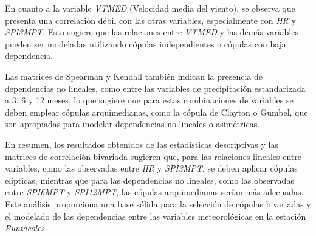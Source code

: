 En cuanto a la variable \textit{VTMED} (Velocidad media del viento), se observa que presenta una correlación débil con las otras variables, especialmente con \textit{HR} y \textit{SPI3MPT}. Esto sugiere que las relaciones entre \textit{VTMED} y las demás variables pueden ser modeladas utilizando cópulas independientes o cópulas con baja dependencia.

Las matrices de Spearman y Kendall también indican la presencia de dependencias no lineales, como entre las variables de precipitación estandarizada a 3, 6 y 12 meses, lo que sugiere que para estas combinaciones de variables se deben emplear cópulas arquimedianas, como la cópula de Clayton o Gumbel, que son apropiadas para modelar dependencias no lineales o asimétricas.

En resumen, los resultados obtenidos de las estadísticas descriptivas y las matrices de correlación bivariada sugieren que, para las relaciones lineales entre variables, como las observadas entre \textit{HR} y \textit{SPI3MPT}, se deben aplicar cópulas elípticas, mientras que para las dependencias no lineales, como las observadas entre \textit{SPI6MPT} y \textit{SPI12MPT}, las cópulas arquimedianas serían más adecuadas. Este análisis proporciona una base sólida para la selección de cópulas bivariadas y el modelado de las dependencias entre las variables meteorológicas en la estación \textit{Puntacoles}.



